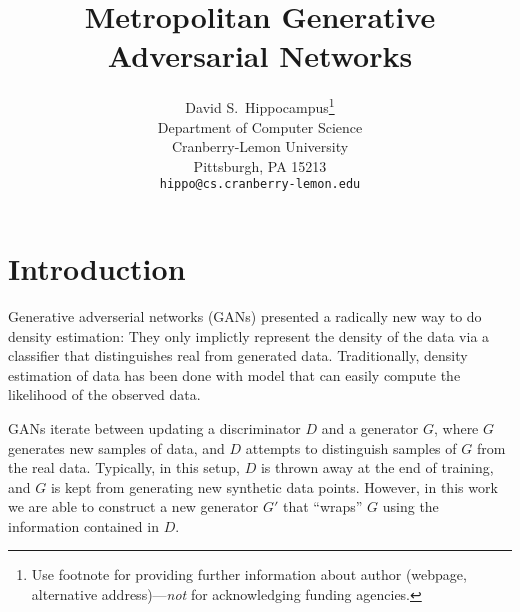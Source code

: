 \documentclass{article}
\title{Metropolitan Generative Adversarial Networks}
\author{
  David S.~Hippocampus\thanks{Use footnote for providing further
    information about author (webpage, alternative
    address)---\emph{not} for acknowledging funding agencies.} \\
  Department of Computer Science\\
  Cranberry-Lemon University\\
  Pittsburgh, PA 15213 \\
  \texttt{hippo@cs.cranberry-lemon.edu} \\
}
\begin{document}

\maketitle


\section{Introduction}

Generative adverserial networks (GANs) presented a radically new way to do density estimation:
They only implictly represent the density of the data via a classifier that distinguishes real from generated data.
Traditionally, density estimation of data has been done with model that can easily compute the likelihood of the observed data.

GANs iterate between updating a discriminator $D$ and a generator $G$, where $G$ generates new samples of data, and $D$ attempts to distinguish samples of $G$ from the real data.
Typically, in this setup, $D$ is thrown away at the end of training, and $G$ is kept from generating new synthetic data points.
However, in this work we are able to construct a new generator $G'$ that ``wraps'' $G$ using the information contained in $D$.

\end{document}
